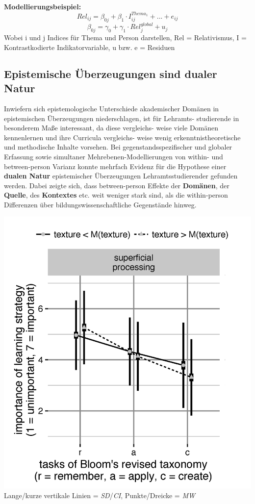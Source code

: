 \documentclass[]{tufte-handout}
\begin{document}
\begin{marginfigure}
\textbf{Modellierungsbeispiel:}
\[Rel_{ij} = \beta_{0j} + \beta_{1} \cdot  I^{Thema_1}_{ij} + ... + e_{ij}\]
\[\beta_{0j} = \gamma_{0} + \gamma_{1} \cdot Rel^{global}_{j} + u_{j}\]
Wobei i und j Indices für Thema und Person darstellen, Rel =
Relativismus, I = Kontrastkodierte Indikatorvariable, u bzw. e =
Residuen
\end{marginfigure}

\subsection{Epistemische Überzeugungen sind dualer
Natur}\label{epistemische-uberzeugungen-sind-dualer-natur}

Inwiefern sich epistemologische Unterschiede akademischer Domänen in
epistemischen Überzeugungen niederschlagen, ist für Lehramts-
studierende in besonderem Maße interessant, da diese vergleichs- weise
viele Domänen kennenlernen und ihre Curricula vergleichs- weise wenig
erkenntnistheoretische und methodische Inhalte vorsehen. Bei
gegenstandsspezifischer und globaler Erfassung sowie simultaner
Mehrebenen-Modellierungen von within- und between-person Varianz konnte
mehrfach Evidenz für die Hypothese einer \textbf{dualen Natur}
epistemischer Überzeugungen Lehramtsstudierender gefunden werden. Dabei
zeigte sich, dass between-person Effekte der \textbf{Domänen}, der
\textbf{Quelle}, des \textbf{Kontextes} etc. weit weniger stark sind,
als die within-person Differenzen über bildungswissenschaftliche
Gegenstände hinweg.

\begin{marginfigure}
\includegraphics{../Img/Kalibrierung_sup4.png} Lange/kurze vertikale
Linien = \emph{SD}/\emph{CI}, Punkte/Dreicke = \emph{MW}
\end{marginfigure}
\end{document}
